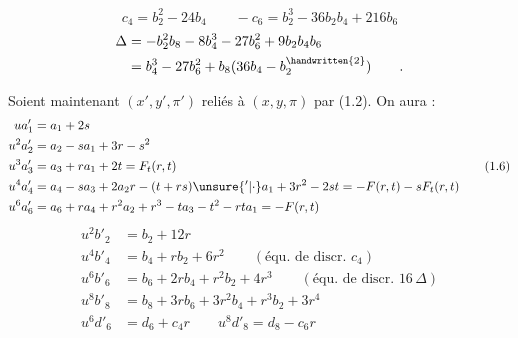 \[
c_4=b_2^2-24b_4\qquad -c_6=b_2^3-36b_2b_4+216b_6\tag*{(1.5)}
\]
\[
\begin{aligned}
\Delta&=-b_2^2b_8-8b_4^3-27b_6^2+9b_2b_4b_6\\
&=b_4^3-27b_6^2+b_8(36b_4-b_2^{\handwritten{2}})\qquad .
\end{aligned}
\]

Soient maintenant $(x',y',\pi')$ reliés à $(x,y,\pi)$ par (1.2). On aura :
\[
\begin{aligned}
ua'_1&=a_1+2s\\
u^2a'_2&=a_2-sa_1+3r-s^2\\
u^3a'_3&=a_3+ra_1+2t=F_t(r,t)\\
u^4a'_4&=a_4-sa_3+2a_2r-(t+rs)\unsure{{}'|\cdot}a_1+3r^2-2st=-F(r,t)-sF_t(r,t)\\
u^6a'_6&=a_6+ra_4+r^2a_2+r^3-ta_3-t^2-rta_1=-F(r,t)
\end{aligned}\tag*{(1.6)}
\]
\[
\begin{aligned}
u^2b'_2&=b_2+12r\\
u^4b'_4&=b_4+rb_2+6r^2\qquad(\text{équ. de discr. }c_4)\\
u^6b'_6&=b_6+2rb_4+r^2b_2+4r^3\qquad(\text{équ. de discr. }16\,\Delta)\\
u^8b'_8&=b_8+3rb_6+3r^2b_4+r^3b_2+3r^4\\
u^6d'_6&=d_6+c_4r\qquad u^8d'_8=d_8-c_6r
\end{aligned}\tag*{(1.7)}
\]

